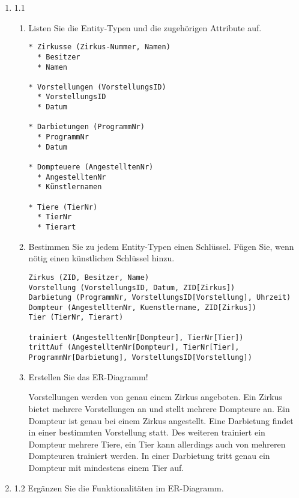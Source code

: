 \documentclass{lehramt-informatik-aufgabe}
\begin{document}
\begin{enumerate}
\item 1.1

\begin{enumerate}


\item Listen Sie die Entity-Typen und die zugehörigen Attribute auf.

\begin{verbatim}
* Zirkusse (Zirkus-Nummer, Namen)
  * Besitzer
  * Namen

* Vorstellungen (VorstellungsID)
  * VorstellungsID
  * Datum

* Darbietungen (ProgrammNr)
  * ProgrammNr
  * Datum

* Dompteuere (AngestelltenNr)
  * AngestelltenNr
  * Künstlernamen

* Tiere (TierNr)
  * TierNr
  * Tierart
\end{verbatim}


\item Bestimmen Sie zu jedem Entity-Typen einen Schlüssel.
Fügen Sie, wenn nötig einen künstlichen Schlüssel hinzu.

\begin{verbatim}
Zirkus (ZID, Besitzer, Name)
Vorstellung (VorstellungsID, Datum, ZID[Zirkus])
Darbietung (ProgrammNr, VorstellungsID[Vorstellung], Uhrzeit)
Dompteur (AngestelltenNr, Kuenstlername, ZID[Zirkus])
Tier (TierNr, Tierart)

trainiert (AngestelltenNr[Dompteur], TierNr[Tier])
trittAuf (AngestelltenNr[Dompteur], TierNr[Tier], ProgrammNr[Darbietung], VorstellungsID[Vorstellung])
\end{verbatim}


\item Erstellen Sie das ER-Diagramm!

Vorstellungen werden von genau einem Zirkus angeboten. Ein Zirkus bietet
mehrere Vorstellungen an und stellt mehrere Dompteure an. Ein Dompteur
ist genau bei einem Zirkus angestellt. Eine Darbietung findet in einer
bestimmten Vorstellung statt. Des weiteren trainiert ein Dompteur
mehrere Tiere, ein Tier kann allerdings auch von mehreren Dompteuren
trainiert werden. In einer Darbietung tritt genau ein Dompteur mit
mindestens einem Tier auf.
\end{enumerate}

\item 1.2 Ergänzen Sie die Funktionalitäten im ER-Diagramm.


\end{enumerate}
\end{document}
